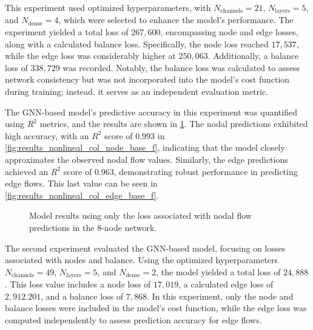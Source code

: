 This experiment used optimized hyperparameters, with \( N_{\text{channels}} = 21 \), \( N_{\text{layers}} = 5 \), and \( N_{\text{dense}} = 4 \), which were selected to enhance the model's performance. The experiment yielded a total loss of \( 267,600 \), encompassing node and edge losses, along with a calculated balance loss. Specifically, the node loss reached \( 17,537 \), while the edge loss was considerably higher at \( 250,063 \). Additionally, a balance loss of \( 338,729 \) was recorded. Notably, the balance loss was calculated to assess network consistency but was not incorporated into the model's cost function during training; instead, it serves as an independent evaluation metric. 

The GNN-based model's predictive accuracy in this experiment was quantified using \( R^2 \) metrics, and the results are shown in \cref{fig:col_base_f_results_non_lineal}. The nodal predictions exhibited high accuracy, with an \( R^2 \) score of \( 0.993 \) in \cref{fig:results_nonlineal_col_node_base_f}, indicating that the model closely approximates the observed nodal flow values. Similarly, the edge predictions achieved an \( R^2 \) score of \( 0.963 \), demonstrating robust performance in predicting edge flows. This last value can be seen in \cref{fig:results_nonlineal_col_edge_base_f}.


\begin{figure}
    \centering
    \setlength{}        
    \setlength{} 
    
    \caption{Model results using only the loss associated with nodal flow predictions in the 8-node network.}
    \label{fig:col_base_f_results_non_lineal}
\end{figure}


The second experiment evaluated the GNN-based model, focusing on losses associated with nodes and balance. Using the optimized hyperparameters \( N_{\text{channels}} = 49 \), \( N_{\text{layers}} = 5 \), and \( N_{\text{dense}} = 2 \), the model yielded a total loss of \( 24,888 \). This loss value includes a node loss of \( 17,019 \), a calculated edge loss of \( 2,912.201 \), and a balance loss of \( 7,868 \). In this experiment, only the node and balance losses were included in the model's cost function, while the edge loss was computed independently to assess prediction accuracy for edge flows.

